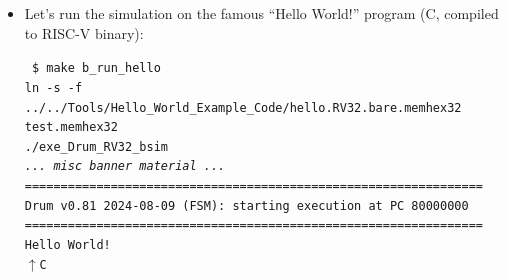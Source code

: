 \begin{frame}[fragile]
\begin{center}
\begin{minipage}{0.8\textwidth}
\begin{itemize}
   \vspace*{1ex}

   ... creates the executable {\tt ./exe\_Drum\_RV32\_bsim}

   \item Let's run the simulation on the famous ``Hello World!''
     program (C, compiled to RISC-V binary):

   \hmm\begin{minipage}{0.8\textwidth}\tiny
     \begin{tabbing}\tt
       \$ make b\_run\_hello \\
       ln -s -f ../../Tools/Hello\_World\_Example\_Code/hello.RV32.bare.memhex32 test.memhex32 \\
       ./exe\_Drum\_RV32\_bsim \\
       {\it ... misc banner material ...} \\
       ================================================================ \\
       Drum v0.81 2024-08-09 (FSM): starting execution at PC 80000000 \\
       ================================================================ \\
       Hello World! \\
       $\uparrow$C
     \end{tabbing}
   \end{minipage}

  \end{itemize}

 \end{minipage}
\end{center}

\end{frame}


